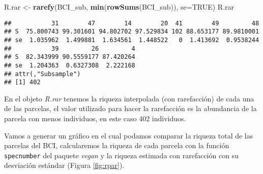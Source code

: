\documentclass[]{book}
\newenvironment{Shaded}{\begin{snugshade}}{\end{snugshade}}
\newcommand{\KeywordTok}[1]{\textcolor[rgb]{0.13,0.29,0.53}{\textbf{{#1}}}}
\newcommand{\DataTypeTok}[1]{\textcolor[rgb]{0.13,0.29,0.53}{{#1}}}
\newcommand{\StringTok}[1]{\textcolor[rgb]{0.31,0.60,0.02}{{#1}}}
\newcommand{\OtherTok}[1]{\textcolor[rgb]{0.56,0.35,0.01}{{#1}}}
\newcommand{\NormalTok}[1]{{#1}}
\begin{document}
\begin{Shaded}
\begin{Highlighting}[]
\NormalTok{R.rar <-}\StringTok{ }\KeywordTok{rarefy}\NormalTok{(BCI_sub, }\KeywordTok{min}\NormalTok{(}\KeywordTok{rowSums}\NormalTok{(BCI_sub)), }\DataTypeTok{se=}\OtherTok{TRUE}\NormalTok{)}
\NormalTok{R.rar}
\end{Highlighting}
\end{Shaded}

\begin{verbatim}
##           31        47        14        20  41        49         48
## S  75.800743 99.301601 94.802702 97.529834 102 88.653177 89.9810001
## se  1.035962  1.499881  1.634561  1.448522   0  1.413692  0.9538244
##           39         26         4
## S  82.343999 90.5559177 87.420264
## se  1.204363  0.6327308  2.222168
## attr(,"Subsample")
## [1] 402
\end{verbatim}

En el objeto \emph{R.rar} tenemos la riqueza interpolada (con
rarefacción) de cada una de las parcelas, el valor utilizado para hacer
la rarefacción es la abundancia de la parcela con menos individuos, en
este caso 402 individuos.

Vamos a generar un gráfico en el cual podamos comparar la riqueza total
de las parcelas del BCI, calcularemos la riqueza de cada parcela con la
función \texttt{specnumber} del paquete \emph{vegan} y la riqueza
estimada con rarefacción con su desviación estándar (Figura
\ref{fig:rpar}).
\end{document}
